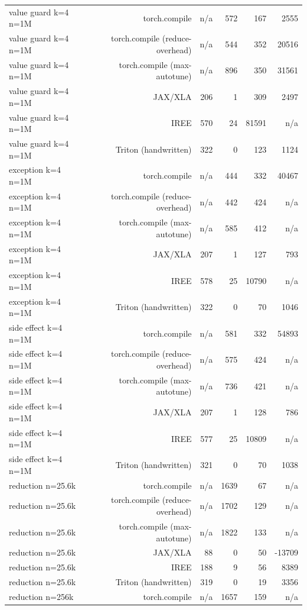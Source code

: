 \begin{tabular}{lrrrrr}
value guard k=4 n=1M & torch.compile & n/a & 572 & 167 & 2555 \\
value guard k=4 n=1M & torch.compile (reduce-overhead) & n/a & 544 & 352 & 20516 \\
value guard k=4 n=1M & torch.compile (max-autotune) & n/a & 896 & 350 & 31561 \\
value guard k=4 n=1M & JAX/XLA & 206 & 1 & 309 & 2497 \\
value guard k=4 n=1M & IREE & 570 & 24 & 81591 & n/a \\
value guard k=4 n=1M & Triton (handwritten) & 322 & 0 & 123 & 1124 \\
exception k=4 n=1M & torch.compile & n/a & 444 & 332 & 40467 \\
exception k=4 n=1M & torch.compile (reduce-overhead) & n/a & 442 & 424 & n/a \\
exception k=4 n=1M & torch.compile (max-autotune) & n/a & 585 & 412 & n/a \\
exception k=4 n=1M & JAX/XLA & 207 & 1 & 127 & 793 \\
exception k=4 n=1M & IREE & 578 & 25 & 10790 & n/a \\
exception k=4 n=1M & Triton (handwritten) & 322 & 0 & 70 & 1046 \\
side effect k=4 n=1M & torch.compile & n/a & 581 & 332 & 54893 \\
side effect k=4 n=1M & torch.compile (reduce-overhead) & n/a & 575 & 424 & n/a \\
side effect k=4 n=1M & torch.compile (max-autotune) & n/a & 736 & 421 & n/a \\
side effect k=4 n=1M & JAX/XLA & 207 & 1 & 128 & 786 \\
side effect k=4 n=1M & IREE & 577 & 25 & 10809 & n/a \\
side effect k=4 n=1M & Triton (handwritten) & 321 & 0 & 70 & 1038 \\
reduction n=25.6k & torch.compile & n/a & 1639 & 67 & n/a \\
reduction n=25.6k & torch.compile (reduce-overhead) & n/a & 1702 & 129 & n/a \\
reduction n=25.6k & torch.compile (max-autotune) & n/a & 1822 & 133 & n/a \\
reduction n=25.6k & JAX/XLA & 88 & 0 & 50 & -13709 \\
reduction n=25.6k & IREE & 188 & 9 & 56 & 8389 \\
reduction n=25.6k & Triton (handwritten) & 319 & 0 & 19 & 3356 \\
reduction n=256k & torch.compile & n/a & 1657 & 159 & n/a \\

\end{tabular}
